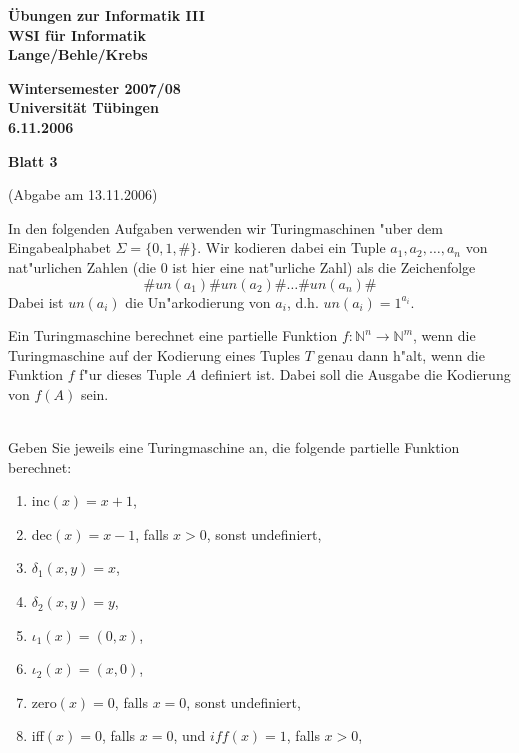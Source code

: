 \documentclass[a4paper]{article}
\def\header#1#2#3{\pagestyle{empty}
\noindent
\begin{minipage}[t]{0.6\textwidth}
\begin{flushleft}
\bf \"Ubungen zur Informatik III\\
WSI f\"ur Informatik\\
Lange/Behle/Krebs
\end{flushleft}
\end{minipage}
\begin{minipage}[t]{0.4\textwidth}
\begin{flushright}
\bf Wintersemester 2007/08\\
Universit\"at T\"ubingen\\
#2 %
\end{flushright}
\end{minipage}

\begin{center}
{\Large\bf Blatt #1}

{(Abgabe am #3)}
\end{center}
}
\begin{document}
\header{3}{6.11.2006}{13.11.2006}


In den folgenden Aufgaben verwenden wir Turingmaschinen "uber dem Eingabealphabet $\Sigma=\{0,1,\#\}$. Wir kodieren dabei ein Tuple $a_1,a_2,\dots,a_n$ von nat"urlichen Zahlen (die 0 ist hier eine nat"urliche Zahl) als die Zeichenfolge $$\#un(a_1)\#un(a_2)\#\dots\#un(a_n)\#$$ Dabei ist $un(a_i)$ die Un"arkodierung von $a_i$, d.h. $un(a_i)=1^{a_i}$. 

Ein Turingmaschine berechnet eine partielle Funktion $f:\mathbb{N}^n\rightarrow \mathbb{N}^m$, wenn die Turingmaschine auf der Kodierung eines Tuples $T$ genau dann h"alt, wenn die Funktion $f$ f"ur dieses Tuple $A$ definiert ist. Dabei soll die Ausgabe die Kodierung von $f(A)$ sein.

\begin{center}
\end{center}

\bigskip
\bigskip


\\
Geben Sie jeweils eine Turingmaschine an, die folgende partielle Funktion berechnet:
\begin{enumerate}
\item inc$(x)=x+1$, 
\item dec$(x)=x-1$, falls $x>0$, sonst undefiniert,
\item $\delta_1(x,y)=x$,
\item $\delta_2(x,y)=y$,
\item $\iota_1(x)=(0,x)$,
\item $\iota_2(x)=(x,0)$,
\item zero$(x)=0$, falls $x=0$, sonst undefiniert,
\item iff$(x)=0$, falls $x=0$, und $iff(x)=1$, falls $x>0$,
\end{enumerate}
\bigskip
\end{document}

